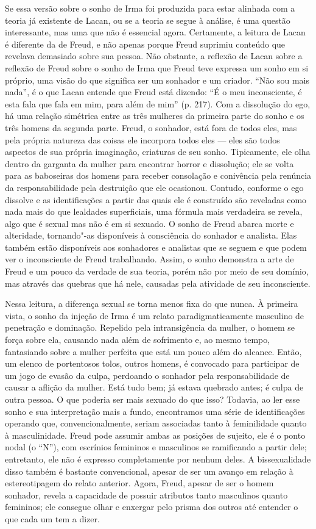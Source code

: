 Se essa versão sobre o sonho de Irma foi produzida para estar alinhada
com a teoria já existente de Lacan, ou se a teoria se segue à análise, é
uma questão interessante, mas uma que não é essencial agora. Certamente,
a leitura de Lacan é diferente da de Freud, e não apenas porque Freud
suprimiu conteúdo que revelava demasiado sobre sua pessoa. Não obstante,
a reflexão de Lacan sobre a reflexão de Freud sobre o sonho de Irma que
Freud teve expressa um sonho em si próprio, uma visão do que significa
ser um sonhador e um criador. ``Não sou mais nada'', é o que Lacan
entende que Freud está dizendo: ``É o meu inconsciente, é esta fala que
fala em mim, para além de mim'' (p. 217). Com a dissolução do ego, há
uma relação simétrica entre as três mulheres da primeira parte do sonho
e os três homens da segunda parte. Freud, o sonhador, está fora de todos
eles, mas pela própria natureza das coisas ele incorpora todos eles ---
eles são todos aspectos de sua própria imaginação, criaturas de seu
sonho. Tipicamente, ele olha dentro da garganta da mulher para encontrar
horror e dissolução; ele se volta para as baboseiras dos homens para
receber consolação e conivência pela renúncia da responsabilidade pela
destruição que ele ocasionou. Contudo, conforme o ego dissolve e as
identificações a partir das quais ele é construído são reveladas como
nada mais do que lealdades superficiais, uma fórmula mais verdadeira se
revela, algo que é sexual mas não é em si sexuado. O sonho de Freud
abarca morte e alteridade, tornando"-as disponíveis à consciência do
sonhador e analista. Elas também estão disponíveis aos sonhadores e
analistas que se seguem e que podem ver o inconsciente de Freud
trabalhando. Assim, o sonho demonstra a arte de Freud e um pouco da
verdade de sua teoria, porém não por meio de seu domínio, mas através
das quebras que há nele, causadas pela atividade de seu inconsciente.

Nessa leitura, a diferença sexual se torna menos fixa do que nunca. À
primeira vista, o sonho da injeção de Irma é um relato
paradigmaticamente masculino de penetração e dominação. Repelido pela
intransigência da mulher, o homem se força sobre ela, causando nada além
de sofrimento e, ao mesmo tempo, fantasiando sobre a mulher perfeita que
está um pouco além do alcance. Então, um elenco de portentosos tolos,
outros homens, é convocado para participar de um jogo de evasão da
culpa, perdoando o sonhador pela responsabilidade de causar a aflição da
mulher. Está tudo bem; já estava quebrado antes; é culpa de outra
pessoa. O que poderia ser mais sexuado do que isso? Todavia, ao ler esse
sonho e sua interpretação mais a fundo, encontramos uma série de
identificações operando que, convencionalmente, seriam associadas tanto
à feminilidade quanto à masculinidade. Freud pode assumir ambas as
posições de sujeito, ele é o ponto nodal (o ``N''), com escrínios
femininos e masculinos se ramificando a partir dele; entretanto, ele não
é expresso completamente por nenhum deles. A bissexualidade disso também
é bastante convencional, apesar de ser um avanço em relação à
estereotipagem do relato anterior. Agora, Freud, apesar de ser o homem
sonhador, revela a capacidade de possuir atributos tanto masculinos
quanto femininos; ele consegue olhar e enxergar pelo prisma dos outros
até entender o que cada um tem a dizer.

